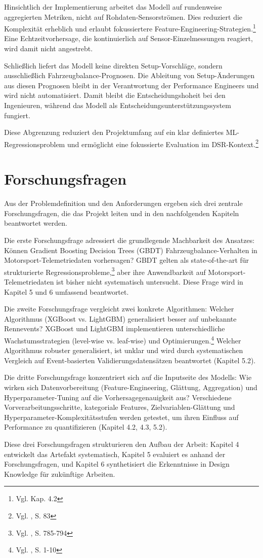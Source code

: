 Hinsichtlich der Implementierung arbeitet das Modell auf rundenweise aggregierten Metriken, nicht auf Rohdaten-Sensorströmen. Dies reduziert die Komplexität erheblich und erlaubt fokussiertere Feature-Engineering-Strategien.\footnote{Vgl. Kap. 4.2} Eine Echtzeitvorhersage, die kontinuierlich auf Sensor-Einzelmessungen reagiert, wird damit nicht angestrebt.

Schließlich liefert das Modell keine direkten Setup-Vorschläge, sondern ausschließlich Fahrzeug\-balance-Prognosen. Die Ableitung von Setup-Änderungen aus diesen Prognosen bleibt in der Verantwortung der Performance Engineers und wird nicht automatisiert. Damit bleibt die Entscheidungshoheit bei den Ingenieuren, während das Modell als Entscheidungsunterstützungssystem fungiert.

Diese Abgrenzung reduziert den Projektumfang auf ein klar definiertes \ac{ML}-Regressionsproblem und ermöglicht eine fokussierte Evaluation im DSR-Kontext.\footnote{Vgl. \cite{Hevner2004}, S. 83}



\section{Forschungsfragen}

Aus der Problemdefinition und den Anforderungen ergeben sich drei zentrale Forschungsfragen, die das Projekt leiten und in den nachfolgenden Kapiteln beantwortet werden.

Die erste Forschungsfrage adressiert die grundlegende Machbarkeit des Ansatzes: Können Gradient Boosting Decision Trees (GBDT) Fahrzeugbalance-Verhalten in Motorsport-Telemetriedaten vorhersagen? GBDT gelten als state-of-the-art für strukturierte Regressionsprobleme,\footnote{Vgl. \cite{Chen2016}, S. 785-794} aber ihre Anwendbarkeit auf Motorsport-Telemetriedaten ist bisher nicht systematisch untersucht. Diese Frage wird in Kapitel 5 und 6 umfassend beantwortet.

Die zweite Forschungsfrage vergleicht zwei konkrete Algorithmen: Welcher Algorithmus (XGBoost vs. LightGBM) generalisiert besser auf unbekannte Rennevents? XGBoost und LightGBM implementieren unterschiedliche Wachstumsstrategien (level-wise vs. leaf-wise) und Optimierungen.\footnote{Vgl. \cite{Ke2017}, S. 1-10} Welcher Algorithmus robuster generalisiert, ist unklar und wird durch systematischen Vergleich auf Event-basierten Validierungsdatensätzen beantwortet (Kapitel 5.2).

Die dritte Forschungsfrage konzentriert sich auf die Inputseite des Modells: Wie wirken sich Datenvorbereitung (Feature-Engineering, Glättung, Aggregation) und Hyperparameter-Tuning auf die Vorhersagegenauigkeit aus? Verschiedene Vorverarbeitungsschritte, kategoriale Features, Zielvariablen-Glättung und Hyperparameter-Komplexitätsstufen werden getestet, um ihren Einfluss auf Performance zu quantifizieren (Kapitel 4.2, 4.3, 5.2).

Diese drei Forschungsfragen strukturieren den Aufbau der Arbeit: Kapitel 4 entwickelt das Artefakt systematisch, Kapitel 5 evaluiert es anhand der Forschungsfragen, und Kapitel 6 synthetisiert die Erkenntnisse in Design Knowledge für zukünftige Arbeiten.
